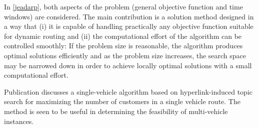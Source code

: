 \documentclass[dissertation,draft*]{aaltoseries}
\begin{document}
In \ref{jeadarp}, both aspects of the problem (general objective function and time windows)
are considered. The main contribution is a solution method designed in a way that (i) it is capable of
handling practically any objective function suitable for dynamic routing and (ii) the computational
effort of the algorithm can be controlled smoothly: If the problem size is reasonable, 
the algorithm produces optimal solutions efficiently and as the problem size increases,
the search space may be narrowed down in order to achieve locally optimal solutions with a small computational effort.

Publication  discusses a single-vehicle algorithm based on hyperlink-induced topic search \cite{kleinberg} 
for maximizing the number of customers in a single vehicle route. The method is seen to
be useful in determining the feasibility of multi-vehicle instances. 
\end{document}
